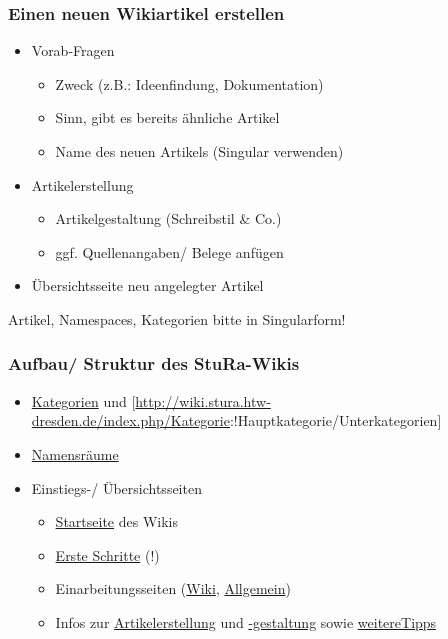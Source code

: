 \documentclass{beamer}
\begin{document}
\begin{frame}
  \frametitle{Einen neuen Wikiartikel erstellen}

  \begin{itemize}
    \item Vorab-Fragen

    \begin{itemize}
      \item Zweck (z.B.: Ideenfindung, Dokumentation)
      \item Sinn, gibt es bereits ähnliche Artikel
      \item Name des neuen Artikels (Singular verwenden)
    \end{itemize}
    \item Artikelerstellung

    \begin{itemize}
      \item Artikelgestaltung (Schreibstil \& Co.)
      \item ggf. Quellenangaben/ Belege anfügen
    \end{itemize}
    \item Übersichtsseite neu angelegter Artikel
  \end{itemize}


  Artikel, Namespaces, Kategorien bitte in Singularform!
\end{frame}


\begin{frame}
  \frametitle{Aufbau/ Struktur des StuRa-Wikis}

  \begin{itemize}
    \item \href{http://wiki.stura.htw-dresden.de/index.php/Spezial:Kategorien}{Kategorien} und [\url{http://wiki.stura.htw-dresden.de/index.php/Kategorie}:!Hauptkategorie/Unterkategorien]
    \item \href{http://wiki.stura.htw-dresden.de/index.php/Admin:Namensr\%C3\%A4ume}{Namensräume}
    \item Einstiegs-/ Übersichtsseiten

    \begin{itemize}
      \item \href{http://wiki.stura.htw-dresden.de/index.php/Hauptseite}{Startseite} des Wikis
      \item \href{http://wiki.stura.htw-dresden.de/index.php/StuRa_HTW_Dresden:Erste_Schritte}{Erste Schritte} (!)
      \item Einarbeitungsseiten (\href{http://wiki.stura.htw-dresden.de/index.php/Wiki/Einarbeitung}{Wiki}, \href{http://wiki.stura.htw-dresden.de/index.php/Einarbeitung}{Allgemein})
      \item Infos zur \href{http://wiki.stura.htw-dresden.de/index.php/Artikelerstellung}{Artikelerstellung} und \href{http://wiki.stura.htw-dresden.de/index.php/Admin:Artikelgestaltung}{-gestaltung} sowie \href{https://de.wikipedia.org/wiki/Wikipedia:Wie_schreibe_ich_gute_Artikel}{weitereTipps}
    \end{itemize}
  \end{itemize}
\end{frame}
\end{document}
